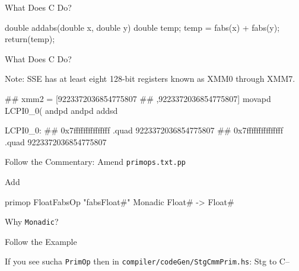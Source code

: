 \documentclass[presentation]{beamer}
\begin{document}
\begin{frame}[fragile]{What Does C Do?}

  \begin{plainC}
    double addabs(double x, double y)
    {
      double temp;
      temp = fabs(x) + fabs(y);
      return(temp);
    }
  \end{plainC}

\end{frame}

\begin{frame}[fragile]{What Does C Do?}

Note: SSE has at least eight 128-bit registers known as XMM0 through XMM7.

  \begin{ASM}
        ## xmm2 = [9223372036854775807
        ##        ,9223372036854775807]
	movapd	LCPI0_0(%
	andpd	%
	andpd	%
	addsd	%

LCPI0_0:
        ## 0x7fffffffffffffff
	.quad	9223372036854775807
        ## 0x7fffffffffffffff
	.quad	9223372036854775807
  \end{ASM}

\end{frame}

\begin{frame}[fragile]{Follow the Commentary: Amend \texttt{primops.txt.pp}}

  Add
  \begin{haskelL}
    primop FloatFabsOp "fabsFloat#" Monadic
           Float# -> Float#
  \end{haskelL}

  Why \texttt{Monadic}?

\end{frame}

\begin{frame}[fragile]{Follow the Example}

  If you see sucha \texttt{PrimOp} then in \texttt{compiler/codeGen/StgCmmPrim.hs}: Stg to C--

\end{frame}
\end{document}
